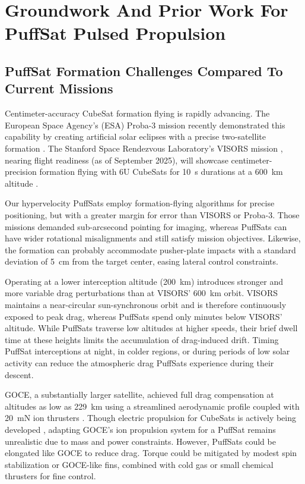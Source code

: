 \documentclass{article}
\begin{document}
\section{Groundwork And Prior Work For PuffSat Pulsed Propulsion}
\subsection{PuffSat Formation Challenges Compared To Current Missions}\label{sec:formation_challenges_current_missions}
Centimeter-accuracy CubeSat formation flying is rapidly advancing. The European Space Agency's (ESA) Proba-3 mission recently demonstrated this capability by creating artificial solar eclipses with a precise two-satellite formation \cite{esa_proba_3}. The Stanford Space Rendezvous Laboratory's VISORS mission \cite{guffanti2023autonomous}, nearing flight readiness (as of September 2025), will showcase centimeter-precision formation flying with 6U CubeSats for \SI{10}{\second} durations at a \SI{600}{\kilo\meter} altitude \cite{visors_formation_flying}.

Our hypervelocity PuffSats employ formation-flying algorithms for precise positioning, but with a greater margin for error than VISORS or Proba-3. Those missions demanded sub-arcsecond pointing for imaging, whereas PuffSats can have wider rotational misalignments and still satisfy mission objectives. Likewise, the formation can probably accommodate pusher-plate impacts with a standard deviation of \SI{5}{\centi\meter} from the target center, easing lateral control constraints.

Operating at a lower interception altitude (\SI{200}{\kilo\meter}) introduces stronger and more variable drag perturbations than at VISORS' \SI{600}{\kilo\meter} orbit. VISORS maintains a near-circular sun-synchronous orbit and is therefore continuously exposed to peak drag, whereas PuffSats spend only minutes below VISORS' altitude. While PuffSats traverse low altitudes at higher speeds, their brief dwell time at these heights limits the accumulation of drag-induced drift.  Timing PuffSat interceptions at night, in colder regions, or during periods of low solar activity can reduce the atmospheric drag PuffSats experience during their descent.

GOCE, a substantially larger satellite, achieved full drag compensation at altitudes as low as  \SI{229}{\kilo\meter} using a streamlined aerodynamic profile coupled with \SI{20}{\milli\newton} ion thrusters \cite{goce_dragfree, goce_229km}. Though electric propulsion for CubeSats is actively being developed \cite{busek_iodine}, adapting GOCE's ion propulsion system for a PuffSat remains unrealistic due to mass and power constraints. However, PuffSats could be elongated like GOCE to reduce drag. Torque could be mitigated by modest spin stabilization or GOCE-like fins, combined with cold gas or small chemical thrusters for fine control.
\end{document}
